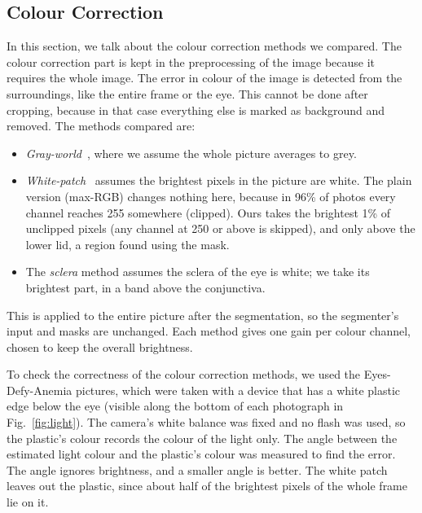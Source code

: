 \documentclass[conference]{IEEEtran}
\begin{document}
\subsection{Colour Correction}
In this section, we talk about the colour correction methods we compared. The
colour correction part is kept in the preprocessing of the image because it
requires the whole image. The error in colour of the image is detected from the
surroundings, like the entire frame or the eye. This cannot be done after
cropping, because in that case everything else is marked as background and
removed. The methods compared are:
\begin{itemize}
\item \emph{Gray-world}~\cite{buchsbaum1980}, where we assume the whole picture
averages to grey.
\item \emph{White-patch}~\cite{land1971} assumes the brightest pixels in the
picture are white. The plain version (max-RGB) changes nothing here, because in
96\% of photos every channel reaches 255 somewhere (clipped). Ours takes the
brightest 1\% of unclipped pixels (any channel at 250 or above is skipped), and
only above the lower lid, a region found using the mask.
\item The \emph{sclera} method assumes the sclera of the eye is white; we take
its brightest part, in a band above the conjunctiva.
\end{itemize}
This is applied to the entire picture after the segmentation, so the
segmenter's input and masks are unchanged. Each method gives one gain per colour
channel, chosen to keep the overall brightness.

To check the correctness of the colour correction methods, we used the
Eyes-Defy-Anemia pictures, which were taken with a device that has a white
plastic edge below the eye (visible along the bottom of each photograph in
Fig.~\ref{fig:light}). The camera's white balance was fixed and no flash was
used, so the plastic's colour records the colour of the light only. The angle
between the estimated light colour and the plastic's colour was measured to find
the error. The angle ignores brightness, and a smaller angle is better. The
white patch leaves out the plastic, since about half of the brightest pixels of
the whole frame lie on it.
\end{document}
